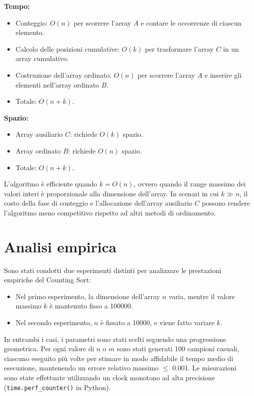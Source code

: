 \documentclass[a4paper, 12pt, oneside]{book}
\begin{document}
\noindent \textbf{Tempo:}

\begin{itemize}
    \item Conteggio: \(O(n)\) per scorrere l'array \(A\) e contare le occorrenze di ciascun elemento.
    \item Calcolo delle posizioni cumulative: \(O(k)\) per trasformare l'array \(C\) in un array cumulativo.
    \item Costruzione dell'array ordinato: \(O(n)\) per scorrere l'array \(A\) e inserire gli elementi nell'array ordinato \(B\).
    \item Totale: \(O(n + k)\).
\end{itemize}

\noindent \textbf{Spazio:}

\begin{itemize}
    \item Array ausiliario \(C\): richiede \(O(k)\) spazio.
    \item Array ordinato \(B\): richiede \(O(n)\) spazio.
    \item Totale: \(O(n + k)\).
\end{itemize}

\noindent L'algoritmo è efficiente quando \(k = O(n)\), ovvero quando il range massimo dei valori interi è proporzionale alla dimensione dell'array.
In scenari in cui \(k \gg n\), il costo della fase di conteggio e l'allocazione dell'array ausiliario \(C\) possono rendere l'algoritmo meno competitivo rispetto ad altri metodi di ordinamento.


\section{Analisi empirica}

Sono stati condotti due esperimenti distinti per analizzare le prestazioni empiriche del Counting Sort:

\begin{itemize}
    \item Nel primo esperimento, la dimensione dell'array \(n\) varia, mentre il valore massimo \(k\) è mantenuto fisso a 100000.
    \item Nel secondo esperimento, \(n\) è fissato a 10000, e viene fatto variare \(k\).
\end{itemize}

\noindent In entrambi i casi, i parametri sono stati scelti seguendo una progressione geometrica.
Per ogni valore di \(n\) o \(m\) sono stati generati 100 campioni casuali, ciascuno eseguito più volte per stimare in modo affidabile il tempo medio di esecuzione, mantenendo un errore relativo massimo \(\leq\) 0.001.
Le misurazioni sono state effettuate utilizzando un clock monotono ad alta precisione (\texttt{time.perf\_counter()} in Python). \\
\end{document}

